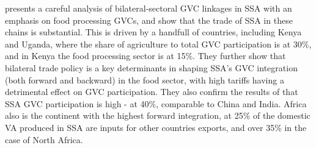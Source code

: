 \documentclass[a4paper]{article}
\begin{document}
\citet{balie2019does} presents a careful analysis of bilateral-sectoral GVC linkages in SSA with an emphasis on food processing GVCs, and show that the trade of SSA in these chains is substantial. This is driven by a handfull of countries, including Kenya and Uganda, where the share of agriculture to total GVC participation is at 30\%, and in Kenya the food processing sector is at 15\%. They further show that bilateral trade policy is a key determinants in shaping SSA's GVC integration (both forward and backward) in the food sector, with high tariffs having a detrimental effect on GVC participation. They also confirm the results of \citet{foster2015global} that SSA GVC participation is high - at 40\%, comparable to China and India. Africa also is the continent with the highest forward integration, at 25\% of the domestic VA produced in SSA are inputs for other countries exports, and over 35\% in the case of North Africa.\newline

\end{document}
